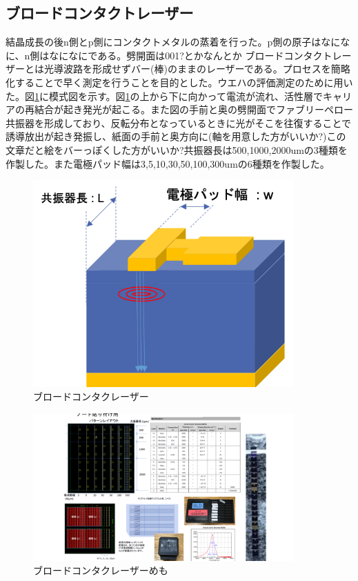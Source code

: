 \newpage
\subsection{ブロードコンタクトレーザー}%
結晶成長の後n側とp側にコンタクトメタルの蒸着を行った。p側の原子はなになに、n側はなになにである。劈開面は001?とかなんとか
ブロードコンタクトレーザーとは光導波路を形成せずバー(棒)のままのレーザーである。プロセスを簡略化することで早く測定を行うことを目的とした。ウエハの評価測定のために用いた。図\ref{fig:sample_broadcontact}に模式図を示す。図\ref{fig:sample_broadcontact}の上から下に向かって電流が流れ、活性層でキャリアの再結合が起き発光が起こる。また図の手前と奥の劈開面でファブリーペロー共振器を形成しており、反転分布となっているときに光がそこを往復することで誘導放出が起き発振し、紙面の手前と奥方向に(軸を用意した方がいいか?)この文章だと絵をバーっぽくした方がいいか?共振器長は500,1000,2000umの3種類を作製した。また電極パッド幅は3,5,10,30,50,100,300umの6種類を作製した。

\begin{figure}[t]
	\centering
	\includegraphics[width=10cm]{figure/fig_2_1_broadcontact.png}
	\caption{ブロードコンタクレーザー}
	\label{fig:sample_broadcontact}
\end{figure}

\begin{figure}[t]
	\centering
	\includegraphics[width=10cm]{figure/fig_2_1_broadcontact_memo.png}
	\caption{ブロードコンタクレーザーめも}
	\label{fig:sample_broadcontact_memo}
\end{figure}

